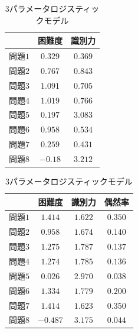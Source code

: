 \documentclass[12pt]{jarticle}
\numberwithin{equation}{subsection}
\begin{document}
\begin{table}[H]
  \begin{minipage}[t]{.45\textwidth}
    \begin{center}
      \begin{tabular}{|l||c|c|} \hline
        & 困難度& 識別力 \\ \hline \hline
        $問題1$ & $0.329$ & $0.369$  \\ \hline
        $問題2$ & $0.767$ & $0.843$  \\ \hline
        $問題3$ & $1.091$ & $0.705$   \\ \hline
        $問題4$ & $1.019$ & $0.766$   \\ \hline
        $問題5$ & $0.197$ & $3.083$   \\ \hline
        $問題6$ & $0.958$ & $0.534$   \\ \hline
        $問題7$ & $0.259$ & $0.431$   \\ \hline
        $問題8$ & $-0.18$ & $3.212$   \\ \hline
      \end{tabular}
    \end{center}
    \caption{$2$パラメータロジスティックモデル}
  \end{minipage}
  \begin{minipage}[t]{.45\textwidth}
    \vspace{-2.83cm}
    \begin{center}
      \begin{tabular}{|l||c|c|c|} \hline
        & 困難度& 識別力 & 偶然率\\ \hline \hline
        $問題1$ & $1.414$ & $1.622$ &$0.350$ \\ \hline
        $問題2$ & $0.958$ & $1.674$ &$0.140$ \\ \hline
        $問題3$ & $1.275$ & $1.787$ &$0.137$ \\ \hline
        $問題4$ & $1.274$ & $1.785$ &$0.136$ \\ \hline
        $問題5$ & $0.026$ & $2.970$ &$0.038$ \\ \hline
        $問題6$ & $1.334$ & $1.779$ &$0.200$ \\ \hline
        $問題7$ & $1.414$ & $1.623$ &$0.350$ \\ \hline
        $問題8$ & $-0.487$ & $3.175$ &$0.044$ \\ \hline
      \end{tabular}
    \end{center}
    \caption{$3$パラメータロジスティックモデル}
  \end{minipage}
\end{table}
\end{document}
